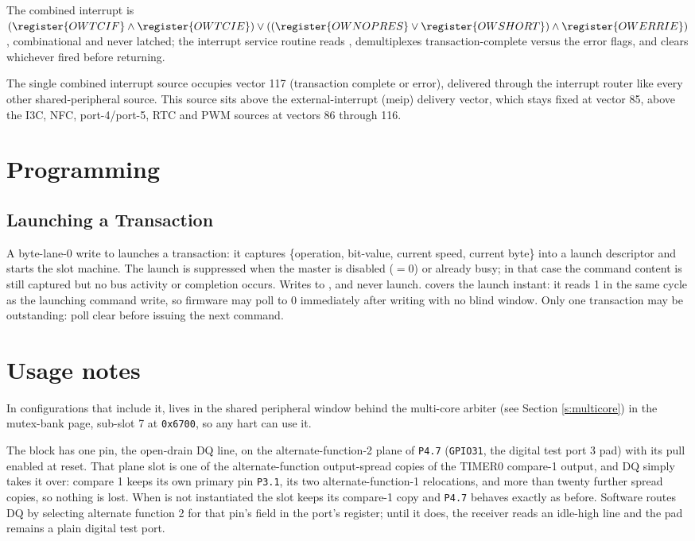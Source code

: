 The combined interrupt is $(\register{OWTCIF} \wedge \register{OWTCIE}) \vee ((\register{OWNOPRES} \vee \register{OWSHORT}) \wedge \register{OWERRIE})$, combinational and never latched; the interrupt service routine reads , demultiplexes transaction-complete versus the error flags, and clears whichever fired before returning.

The single combined interrupt source occupies vector 117 (transaction complete or error), delivered through the interrupt router like every other shared-peripheral source. This source sits above the external-interrupt (meip) delivery vector, which stays fixed at vector 85, above the I3C, NFC,  port-4/port-5, RTC and PWM sources at vectors 86 through 116.

\section{Programming}

\subsection{Launching a Transaction}

A byte-lane-0 write to  launches a transaction: it captures \{operation, bit-value, current speed, current  byte\} into a launch descriptor and starts the slot machine. The launch is suppressed when the master is disabled ($=0$) or already busy; in that case the command content is still captured but no bus activity or completion occurs. Writes to ,  and  never launch.  covers the launch instant: it reads 1 in the same cycle as the launching command write, so firmware may poll  to 0 immediately after writing  with no blind window. Only one transaction may be outstanding: poll  clear before issuing the next command.

\section{Usage notes}

In configurations that include it,  lives in the shared peripheral window behind the multi-core arbiter (see Section \ref{s:multicore}) in the mutex-bank page, sub-slot 7 at \texttt{0x6700}, so any hart can use it.

The block has one pin, the open-drain DQ line, on the alternate-function-2 plane of \texttt{P4.7} (\texttt{GPIO31}, the digital test port 3 pad) with its pull enabled at reset. That plane slot is one of the alternate-function output-spread copies of the TIMER0 compare-1 output, and DQ simply takes it over: compare 1 keeps its own primary pin \texttt{P3.1}, its two alternate-function-1 relocations, and more than twenty further spread copies, so nothing is lost. When  is not instantiated the slot keeps its compare-1 copy and \texttt{P4.7} behaves exactly as before. Software routes DQ by selecting alternate function 2 for that pin's field in the port's  register; until it does, the receiver reads an idle-high line and the pad remains a plain digital test port.
